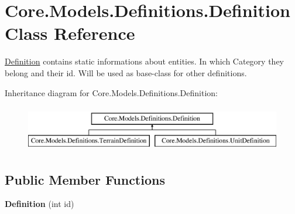 \hypertarget{classCore_1_1Models_1_1Definitions_1_1Definition}{\section{Core.\-Models.\-Definitions.\-Definition Class Reference}
\label{classCore_1_1Models_1_1Definitions_1_1Definition}
}


\hyperlink{classCore_1_1Models_1_1Definitions_1_1Definition}{Definition} contains static informations about entities. In which Category they belong and their id. Will be used as base-\/class for other definitions.  


Inheritance diagram for Core.\-Models.\-Definitions.\-Definition\-:\begin{figure}[H]
\begin{center}
\leavevmode
\includegraphics[height=2.000000cm]{classCore_1_1Models_1_1Definitions_1_1Definition}
\end{center}
\end{figure}
\subsection*{Public Member Functions}
\begin{DoxyCompactItemize}
\item 
\hypertarget{classCore_1_1Models_1_1Definitions_1_1Definition_a58b73a00c59e999041dffb2b6a273d8f}{{\bfseries Definition} (int id)}\label{classCore_1_1Models_1_1Definitions_1_1Definition_a58b73a00c59e999041dffb2b6a273d8f}

\end{DoxyCompactItemize}
